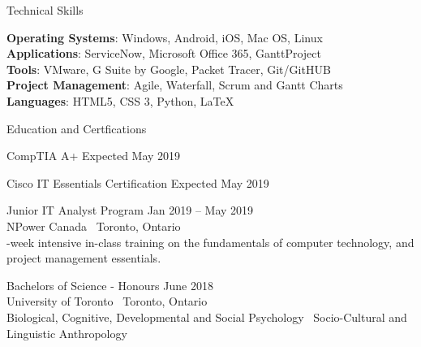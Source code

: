 \documentclass{article}
\begin{document}
\begin{center}
 \large \textcolor{ablue}{Technical Skills}
\end{center}

\begin{flushleft}

\noindent\textbf{Operating Systems}: Windows, Android, iOS, Mac OS, Linux\\
\textbf{Applications}: ServiceNow, Microsoft Office 365, GanttProject\\
\textbf{Tools}: VMware, G Suite by Google, Packet Tracer, Git/GitHUB\\
\textbf{Project Management}: Agile, Waterfall, Scrum and Gantt Charts\\
\textbf{Languages}: HTML5, CSS 3, Python, \LaTeX \\

\end{flushleft}


\begin{center}
 \large  \textcolor{ablue}{Education and Certfications}
\end{center}

\begin{doublespacing}

\noindent CompTIA A+    
\hfill Expected May 2019

\noindent Cisco IT Essentials Certification
\hfill Expected May 2019 

\begin{singlespacing}

\noindent Junior IT Analyst Program 
\hfill Jan 2019 – May 2019 
\\\noindent NPower Canada \textbar \ {Toronto, Ontario }
\\-week intensive in-class training on the fundamentals of computer technology, and project management essentials.

\end{singlespacing}

\begin{singlespacing}

\noindent Bachelors of Science - Honours 
\hfill June 2018 
\\\noindent University of Toronto \textbar \ Toronto, Ontario
\\\noindent Biological, Cognitive, Developmental and Social Psychology \textbar  \ Socio-Cultural and Linguistic Anthropology 

\end{singlespacing}

\end{doublespacing}
\end{document}
